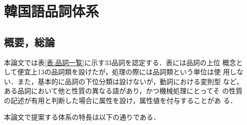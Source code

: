 \section{韓国語品詞体系}
\label{節:品詞体系}

\subsection{概要，総論}

本論文では表\ref{表:品詞一覧}に示す33品詞を認定する．表には品詞の上位
概念として便宜上13の品詞類を設けたが，処理の際には品詞類という単位は使
用しない．また，基本的に品詞の下位分類は設けないが，動詞における変則型
など，ある品詞において他と性質の異なる語があり，かつ機械処理にとってそ
の性質の記述が有用と判断した場合に属性を設け，属性値を付与することがあ
る．

本論文で提案する体系の特長は以下の通りである．

